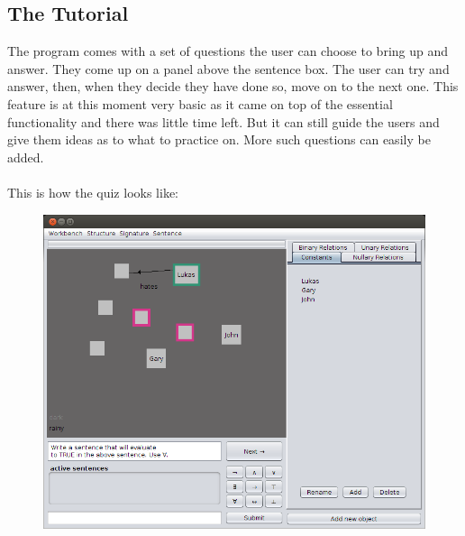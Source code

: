 \documentclass{report}
\begin{document}
\subsection{The Tutorial}
The program comes with a set of questions the user can choose to bring up and
answer. They come up on a panel above the sentence box. The user can try and
answer, then, when they decide they have done so, move on to the next one.
This feature is at this moment very basic as it came on top of the essential
functionality and there was little time left. But it can still guide the users
and give them ideas as to what to practice on. More such questions can easily
be added. \\ \\
This is how the quiz looks like:
\begin{figure}[h!]
\centering \includegraphics[width=\textwidth]{quiz.png}
\end{figure}
\end{document}
